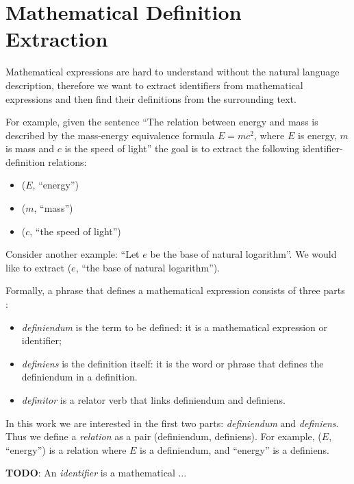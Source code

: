 \section{Mathematical Definition Extraction} \label{sec:definitionextraction-top}

Mathematical expressions are hard to understand without the natural language description,
therefore we want to extract identifiers from mathematical expressions
and then find their definitions from the surrounding text.

For example, given the sentence ``The relation between energy and mass is
described by  the mass-energy equivalence formula $E = mc^2$,
where $E$ is energy, $m$ is mass and $c$ is the speed of light''
the goal is to extract the following identifier-definition relations:

\begin{itemize}
\itemsep1pt\parskip0pt
  \item ($E$, ``energy'')
  \item ($m$, ``mass'')
  \item ($c$, ``the speed of light'')
\end{itemize}

Consider another example: ``Let $e$ be the base of natural logarithm''.
We would like to extract ($e$, ``the base of natural logarithm'').

Formally, a phrase that defines a mathematical expression consists of three parts \cite{kristianto2012extracting}:

\begin{itemize}
\itemsep1pt\parskip0pt
  \item \emph{definiendum} is the term to be defined: it is a mathematical expression or identifier;
  \item \emph{definiens} is the definition itself: it is the word or phrase that defines the definiendum in a definition.
  \item \emph{definitor} is a relator verb that links definiendum and definiens.
\end{itemize}


In this work we are interested in the first two parts: \emph{definiendum} and
\emph{definiens}. Thus we define a \emph{relation} as a pair
(definiendum, definiens). For example, ($E$, ``energy'') is a relation where
$E$ is a definiendum, and ``energy'' is a definiens.


\textbf{TODO}: An \emph{identifier} is a mathematical ...


